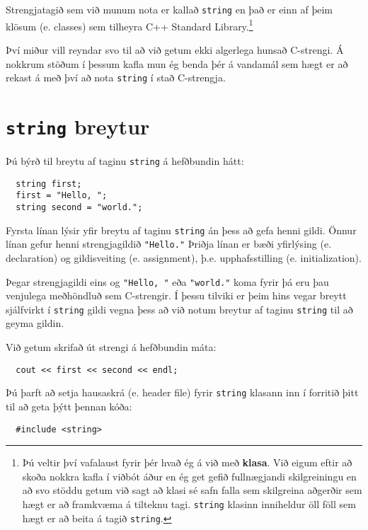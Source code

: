 Strengjatagið sem við munum nota er kallað {\tt string} en það er einn af þeim klösum (e. classes) sem tilheyra C++ Standard Library.\footnote{Þú veltir því vafalaust fyrir þér hvað ég á við með {\bf klasa}. Við eigum eftir að skoða nokkra kafla í viðbót áður en ég get gefið fullnægjandi skilgreiningu
en að svo stöddu getum við sagt að klasi sé safn falla sem skilgreina aðgerðir sem hægt er að framkvæma á tilteknu tagi.
{\tt string} klasinn inniheldur öll föll sem hægt er að beita á tagið {\tt string}.}

Því miður vill reyndar svo til að við getum ekki algerlega hunsað C-strengi.
Á nokkrum stöðum í þessum kafla mun ég benda þér á vandamál sem hægt er að rekast á með því að nota {\tt string} í stað C-strengja.

\section{{\tt string} breytur}

Þú býrð til breytu af taginu {\tt string} á hefðbundin hátt:

\begin{verbatim}
  string first;
  first = "Hello, ";
  string second = "world.";
\end{verbatim}
%
Fyrsta línan lýsir yfir breytu af taginu {\tt string} án þess að gefa henni gildi.
Önnur línan gefur henni strengjagildið \verb+"Hello."+
Þriðja línan er bæði yfirlýsing (e. declaration) og gildisveiting (e. assignment), þ.e. upphafsstilling (e. initialization).

Þegar strengjagildi eins og \verb+"Hello, "+ eða \verb+"world."+ koma fyrir þá eru þau venjulega meðhöndluð sem C-strengir.
Í þessu tilviki er þeim hins vegar breytt sjálfvirkt í {\tt string} gildi vegna þess að við notum breytur af taginu {\tt string} til að geyma gildin.

Við getum skrifað út strengi á hefðbundin máta: 

\begin{verbatim}
  cout << first << second << endl;
\end{verbatim}
%

Þú þarft að setja hausaskrá (e. header file) fyrir {\tt string} klasann inn í forritið þitt til að geta þýtt þennan kóða:
\begin{verbatim}
  #include <string>
\end{verbatim}


